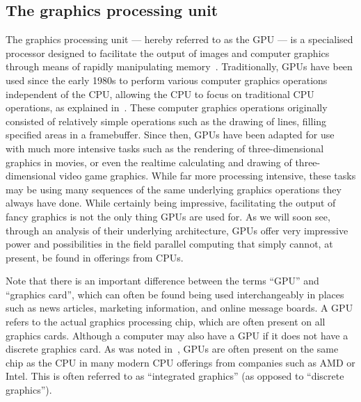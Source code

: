 \documentclass[a4paper,11pt]{article}
\begin{document}
\subsection{The graphics processing unit} %
\label{sub:the_graphics_processing_unit}
The graphics processing unit --- hereby referred to as the GPU --- is a specialised processor designed to facilitate the
output of images and computer graphics through means of rapidly manipulating memory~\cite{web:WikiGPU}. Traditionally,
GPUs have been used since the early 1980s to perform various computer graphics operations independent of the CPU, allowing
the CPU to focus on traditional CPU operations, as explained in~. These
computer graphics operations originally consisted of relatively simple operations such as the drawing of lines, filling
specified areas in a framebuffer. Since then, GPUs have been adapted for use with much more intensive tasks such as
the rendering of three-dimensional graphics in movies, or even the realtime calculating and drawing of three-dimensional
video game graphics. While far more processing intensive, these tasks may be using many sequences of the same underlying
graphics operations they always have done. While certainly being impressive, facilitating the output of fancy graphics is
not the only thing GPUs are used for. As we will soon see, through an analysis of their underlying architecture, GPUs
offer very impressive power and possibilities in the field parallel computing that simply cannot, at present, be found
in offerings from CPUs.

Note that there is an important difference between the terms ``GPU'' and ``graphics card'', which can often be found
being used interchangeably in places such as news articles, marketing information, and online message boards. A GPU refers
to the actual graphics processing chip, which are often present on all graphics cards. Although a computer may also have
a GPU if it does not have a discrete graphics card. As was noted in~, GPUs are
often present on the same chip as the CPU in many modern CPU offerings from companies such as AMD or Intel. This is
often referred to as ``integrated graphics'' (as opposed to ``discrete graphics'').
\end{document}
